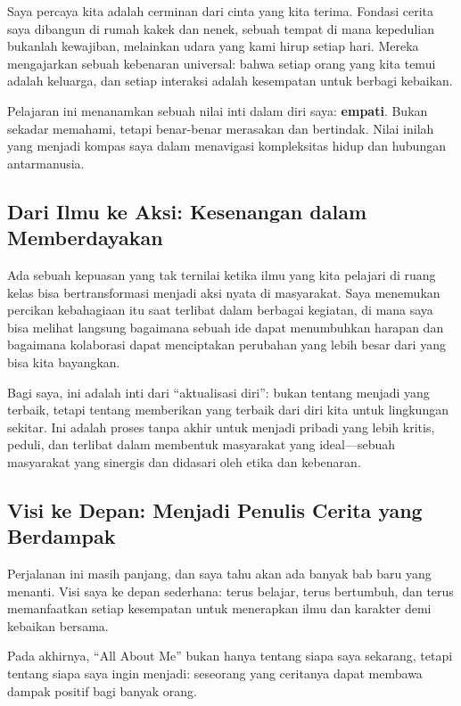 \documentclass[
  letterpaper,
  DIV=11,
  numbers=noendperiod]{scrreprt}
\begin{document}
Saya percaya kita adalah cerminan dari cinta yang kita terima. Fondasi
cerita saya dibangun di rumah kakek dan nenek, sebuah tempat di mana
kepedulian bukanlah kewajiban, melainkan udara yang kami hirup setiap
hari. Mereka mengajarkan sebuah kebenaran universal: bahwa setiap orang
yang kita temui adalah keluarga, dan setiap interaksi adalah kesempatan
untuk berbagi kebaikan.

Pelajaran ini menanamkan sebuah nilai inti dalam diri saya:
\textbf{empati}. Bukan sekadar memahami, tetapi benar-benar merasakan
dan bertindak. Nilai inilah yang menjadi kompas saya dalam menavigasi
kompleksitas hidup dan hubungan antarmanusia.

\subsection{Dari Ilmu ke Aksi: Kesenangan dalam
Memberdayakan}\label{dari-ilmu-ke-aksi-kesenangan-dalam-memberdayakan}

Ada sebuah kepuasan yang tak ternilai ketika ilmu yang kita pelajari di
ruang kelas bisa bertransformasi menjadi aksi nyata di masyarakat. Saya
menemukan percikan kebahagiaan itu saat terlibat dalam berbagai
kegiatan, di mana saya bisa melihat langsung bagaimana sebuah ide dapat
menumbuhkan harapan dan bagaimana kolaborasi dapat menciptakan perubahan
yang lebih besar dari yang bisa kita bayangkan.

Bagi saya, ini adalah inti dari ``aktualisasi diri'': bukan tentang
menjadi yang terbaik, tetapi tentang memberikan yang terbaik dari diri
kita untuk lingkungan sekitar. Ini adalah proses tanpa akhir untuk
menjadi pribadi yang lebih kritis, peduli, dan terlibat dalam membentuk
masyarakat yang ideal---sebuah masyarakat yang sinergis dan didasari
oleh etika dan kebenaran.

\subsection{Visi ke Depan: Menjadi Penulis Cerita yang
Berdampak}\label{visi-ke-depan-menjadi-penulis-cerita-yang-berdampak}

Perjalanan ini masih panjang, dan saya tahu akan ada banyak bab baru
yang menanti. Visi saya ke depan sederhana: terus belajar, terus
bertumbuh, dan terus memanfaatkan setiap kesempatan untuk menerapkan
ilmu dan karakter demi kebaikan bersama.

Pada akhirnya, ``All About Me'' bukan hanya tentang siapa saya sekarang,
tetapi tentang siapa saya ingin menjadi: seseorang yang ceritanya dapat
membawa dampak positif bagi banyak orang.
\end{document}

